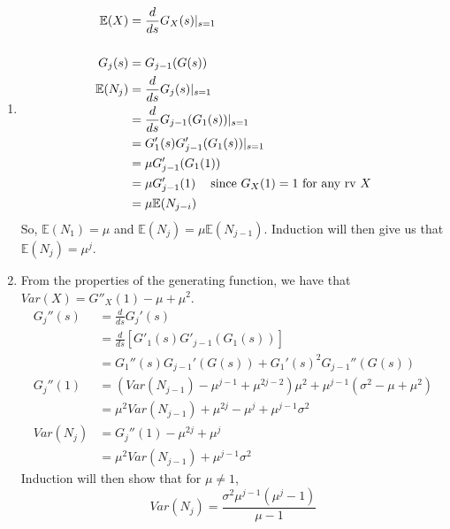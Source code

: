 \documentclass{article}
\begin{document}
\begin{enumerate}
\begin{enumerate}
\begin{enumerate}
\item
\begin{align*}
\mathbb{E}(X) &= \frac{d}{ds}G_X(s)|_{s=1}\\
\\
G_j(s) &= G_{j-1}(G(s))\\
\mathbb{E}(N_j) &= \frac{d}{ds}G_j(s)|_{s=1}\\
&= \frac{d}{ds}G_{j-1}(G_1(s))|_{s=1}\\
&= G_1'(s)G_{j-1}'(G_1(s))|_{s=1}\\
&= \mu G_{j-1}'(G_1(1)) \\
&= \mu G_{j-1}'(1) \mbox{\; \; since $G_X(1)=1$ for any rv $X$} \\
&= \mu \mathbb{E}(N_{j-i})
\end{align*}
So, $\mathbb{E}(N_1) = \mu$ and $\mathbb{E}(N_j) = \mu \mathbb{E}(N_{j-1})$.
Induction will then give us that $\mathbb{E}(N_j) = \mu^j$.

\item
From the properties of the generating function, we have that $Var(X) =
G''_X(1)-\mu+\mu^2$.
\begin{align*}
G_j''(s) &= \frac{d}{ds} G_j'(s)\\
&= \frac{d}{ds} \left[ G'_1(s)G'_{j-1}(G_1(s))\right]\\
&= G_1''(s)G_{j-1}'(G(s)) + G_1'(s)^2G_{j-1}''(G(s))\\
G_j''(1) &=
(Var(N_{j-1})-\mu^{j-1}+\mu^{2j-2})\mu^2+\mu^{j-1}(\sigma^2-\mu+\mu^2)\\
&=\mu^2Var(N_{j-1})+\mu^{2j}-\mu^j+\mu^{j-1}\sigma^2\\
Var(N_j) &= G_j''(1)-\mu^{2j}+\mu^j\\
&= \mu^2Var(N_{j-1})+\mu^{j-1}\sigma^2
\end{align*}
Induction will then show that for $\mu \neq 1$,
$$
Var(N_j) = \frac{\sigma^2\mu^{j-1}(\mu^j-1)}{\mu-1}
$$
\end{enumerate}


\end{enumerate}
\end{enumerate}
\end{document}
